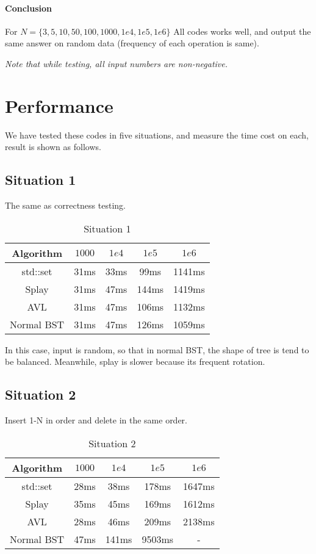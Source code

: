 \documentclass[UTF8]{report}
\numberwithin{figure}{subsection}
\numberwithin{table}{subsection}
\begin{document}
\paragraph{Conclusion} For $N=\{3,5,10,50,100,1000,1e4,1e5,1e6\}$ All codes works well, 
and output the same answer on random data (frequency of each operation is same). 

\textit{Note that while testing, all input numbers are non-negative. }

\section{Performance}
We have tested these codes in five situations, and measure the time cost on each,
result is shown as follows.

\subsection{Situation 1}
The same as correctness testing. 

\begin{table}[h!t]
  \centering
  \begin{tabular}{ccccc}
    \toprule
    Algorithm & $1000$ & $1e4$ & $1e5$ & $1e6$\\
    \midrule
    std::set&31ms&33ms&99ms&1141ms\\
    Splay&31ms&47ms&144ms&1419ms\\
    AVL&31ms&47ms&106ms&1132ms\\
    Normal BST&31ms&47ms&126ms&1059ms\\
    \bottomrule
  \end{tabular}
  \caption{Situation 1}
\end{table}

In this case, input is random, so that in normal BST, the shape of tree is tend to be balanced.
Meanwhile, splay is slower because its frequent rotation.

\subsection{Situation 2}
Insert 1-N in order and delete in the same order.

\begin{table}[h!t]
  \centering
  \begin{tabular}{ccccc}
    \toprule
    Algorithm & $1000$ & $1e4$ & $1e5$ & $1e6$\\
    \midrule
    std::set  &28ms&38ms&178ms&1647ms\\
    Splay     &35ms&45ms&169ms&1612ms\\
    AVL       &28ms&46ms&209ms&2138ms\\
    Normal BST&47ms&141ms&9503ms&-\\
    \bottomrule
  \end{tabular}
  \caption{Situation 2}
\end{table}
\end{document}
